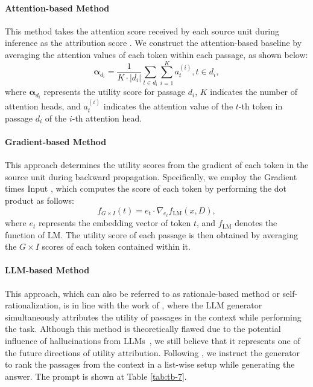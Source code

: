 \documentclass[11pt]{article}
\begin{document}
\paragraph{Attention-based Method} This method takes the attention score received by each source unit during inference as the attribution score \citep{mylonas2022attentionmatrixdecisionfaithfulnessbased, attentionmeetsposthocinterpretability}. We construct the attention-based baseline by averaging the attention values of each token within each passage, as shown below:
\begin{equation}
    \bm{\alpha}_{d_i}= \frac{1}{K \cdot \left | d_i \right | } \sum_{t \in d_i} \sum_{i=1}^{K} a_t^{\left ( i \right ) },t \in d_i,
\end{equation}
where $\bm{\alpha}_{d_i}$ represents the utility score for passage $d_i$, $K$ indicates the number of attention heads, and $a_t^{\left ( i \right ) }$ indicates the attention value of the $t$-th token in passage $d_i$ of the $i$-th attention head.

\paragraph{Gradient-based Method} This approach determines the utility scores from the gradient of each token in the source unit during backward propagation\citep{gradientbasedattributionmethods, wang2024gradientbasedfeatureattribution}. Specifically, we employ the Gradient times Input \citep[$G \times I$;][]{gtimesi}, which computes the score of each token by performing the dot product as follows:
\begin{equation}
    f_{G\times I}(t)=e_t \cdot \nabla_{e_t} f_{\mathrm{LM} }\left ( x,D \right )  ,
\end{equation}
where $e_t$ represents the embedding vector of token $t$, and $f_{\mathrm{LM}}$ denotes the function of $\mathrm{LM}$. The utility score of each passage is then obtained by averaging the $G\times I$ scores of each token contained within it.


\paragraph{LLM-based Method} This approach, which can also be referred to as rationale-based method or self-rationalization, is in line with the work of \citet{sohn2024rationaleguidedretrievalaugmentedgeneration, wei2024instructrag}, where the LLM generator simultaneously attributes the utility of passages in the context while performing the task. Although this method is theoretically flawed due to the potential influence of hallucinations from LLMs~\citep{chen2024llmgeneratedmisinformationdetected}, we still believe that it represents one of the future directions of utility attribution. Following \citet{arellmgoodatutilityjudgements}, we instruct the generator to rank the passages from the context in a list-wise setup while generating the answer. The prompt is shown at Table \ref{tab:tb-7}.
\end{document}
